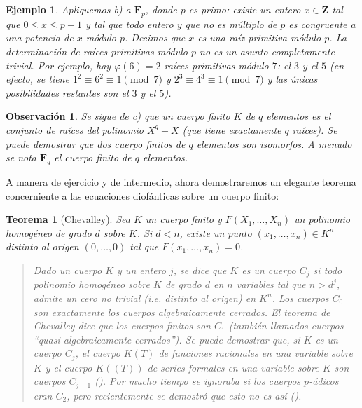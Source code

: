 \documentclass[bibtotoc,leqno,spanish]{amsbook}
\newcommand{\ZZ}{\mathbf{Z}}
\newcommand{\FF}{\mathbf{F}}
\numberwithin{equation}{section}
\newenvironment{comm}%
	{\begin{quotation}\itshape\Small}
	{\end{quotation}}
\theoremstyle{note}
\theoremstyle{note}
\newtheorem{theorem}{Teorema}
\theoremstyle{rem}
\newtheorem*{example*}{Ejemplo}
\newtheorem*{remark*}{Observaci\'on}
\numberwithin{theorem}{section}
\numberwithin{proposition}{section}
\numberwithin{definition}{section}
\numberwithin{lemma}{section}
\numberwithin{corollary}{section}
\numberwithin{example}{section}
\numberwithin{footnote}{section}%
\begin{document}
\begin{example*}
Apliquemos b) a $\FF_{p}$, donde $p$ es primo: existe un entero $x\in\ZZ$ tal que $0\leq x\leq p-1$ y tal
que todo entero $y$ que no es m\'ultiplo de $p$ es congruente a una potencia de $x$ m\'odulo $p$. Decimos
que $x$ es {\em una ra\'iz primitiva m\'odulo $p$.} La determinaci\'on de ra\'ices primitivas m\'odulo
$p$ no es un asunto completamente trivial. Por ejemplo, hay $\varphi(6) = 2$ ra\'ices primitivas m\'odulo $7$:
el $3$ y el $5$ (en efecto, se tiene $1^{2}\equiv 6^{2}\equiv 1\pmod 7$ y $2^{3}\equiv 4^{3}\equiv 1\pmod 7$
y las \'unicas posibilidades restantes son el $3$ y el $5$).
\end{example*}

\begin{remark*}
Se sigue de c) que un cuerpo finito $K$ de $q$ elementos es el conjunto de ra\'ices del polinomio $X^{q}-X$
(que tiene exactamente $q$ ra\'ices). Se puede demostrar que dos cuerpo finitos de $q$ elementos son isomorfos.
A menudo se nota $\FF_{q}$ el cuerpo finito de $q$ elementos.
\end{remark*}

A manera de ejercicio y de intermedio, ahora demostraremos un elegante teorema concerniente a las
ecuaciones diof\'anticas sobre un cuerpo finito:

\begin{theorem}[Chevalley]\label{teo1.7.2}
Sea $K$ un cuerpo finito y $F(X_{1},\dots,X_{n})$ un polinomio homog\'eneo de grado $d$ sobre $K$.
Si $d < n$, existe un punto $(x_{1},\dots,x_{n})\in K^{n}$ distinto al origen $(0,\dots,0)$ tal que
$F(x_{1},\dots,x_{n}) = 0$.
\end{theorem}

\begin{comm}
Dado un cuerpo $K$ y un entero $j$, se dice que $K$ es un {\em cuerpo} $C_{j}$ si todo polinomio
homog\'eneo sobre $K$ de grado $d$ en $n$ variables {\em tal que} $n > d^{j}$, admite un cero no
trivial (i.e. distinto al origen) en $K^{n}$. Los cuerpos $C_{0}$ son exactamente los cuerpos algebraicamente
cerrados. El teorema de Chevalley dice que los cuerpos finitos son $C_{1}$ (tambi\'en llamados
cuerpos ``quasi-algebraicamente cerrados''). Se puede demostrar que, si $K$ es un cuerpo $C_{j}$, el
cuerpo $K(T)$ de funciones racionales en una variable sobre $K$ y el cuerpo $K((T))$ de series formales
en una variable sobre $K$ son cuerpos $C_{j+1}$ (\cite{Lang}). Por mucho tiempo se ignoraba si los
cuerpos $p$-\'adicos eran $C_{2}$, pero recientemente se demostr\'o que esto no es as\'i (\cite{Terjanian}).
\end{comm}
\end{document}
